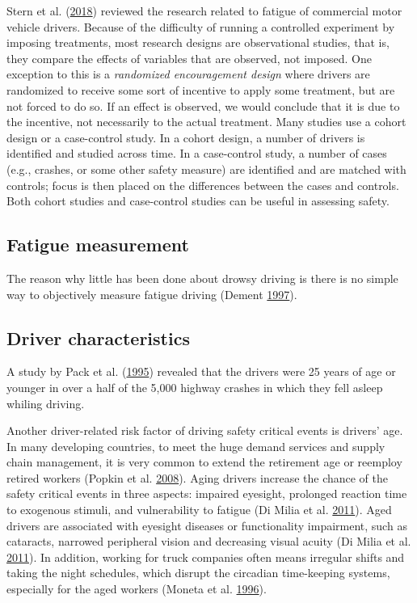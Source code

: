 \documentclass[12pt]{book}
\numberwithin{equation}{chapter}
\begin{document}
Stern et al. (\protect\hyperlink{ref-stern2018data}{2018}) reviewed the research related to fatigue of commercial motor vehicle drivers. Because of the difficulty of running a controlled experiment by imposing treatments, most research designs are observational studies, that is, they compare the effects of variables that are observed, not imposed. One exception to this is a \emph{randomized encouragement design} where drivers are randomized to receive some sort of incentive to apply some treatment, but are not forced to do so. If an effect is observed, we would conclude that it is due to the incentive, not necessarily to the actual treatment. Many studies use a cohort design or a case-control study. In a cohort design, a number of drivers is identified and studied across time. In a case-control study, a number of cases (e.g., crashes, or some other safety measure) are identified and are matched with controls; focus is then placed on the differences between the cases and controls. Both cohort studies and case-control studies can be useful in assessing safety.

\hypertarget{fatigue-measurement}{%
\subsection{Fatigue measurement}\label{fatigue-measurement}}

The reason why little has been done about drowsy driving is there is no simple way to objectively measure fatigue driving (Dement \protect\hyperlink{ref-dement1997perils}{1997}).

\hypertarget{driver-characteristics}{%
\subsection{Driver characteristics}\label{driver-characteristics}}

A study by Pack et al. (\protect\hyperlink{ref-pack1995characteristics}{1995}) revealed that the drivers were 25 years of age or younger in over a half of the 5,000 highway crashes in which they fell asleep whiling driving.

Another driver-related risk factor of driving safety critical events is drivers' age. In many developing countries, to meet the huge demand services and supply chain management, it is very common to extend the retirement age or reemploy retired workers (Popkin et al. \protect\hyperlink{ref-popkin2008age}{2008}). Aging drivers increase the chance of the safety critical events in three aspects: impaired eyesight, prolonged reaction time to exogenous stimuli, and vulnerability to fatigue (Di Milia et al. \protect\hyperlink{ref-di2011demographic}{2011}). Aged drivers are associated with eyesight diseases or functionality impairment, such as cataracts, narrowed peripheral vision and decreasing visual acuity (Di Milia et al. \protect\hyperlink{ref-di2011demographic}{2011}). In addition, working for truck companies often means irregular shifts and taking the night schedules, which disrupt the circadian time-keeping systems, especially for the aged workers (Moneta et al. \protect\hyperlink{ref-moneta1996time}{1996}).
\end{document}
